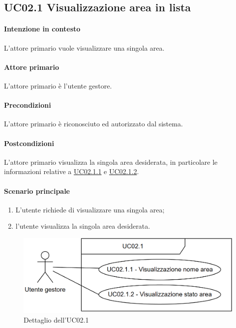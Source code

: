 \subsection{UC02.1 Visualizzazione area in lista}
\paragraph{Intenzione in contesto} L'attore primario vuole visualizzare una singola area.

\paragraph{Attore primario} L'attore primario è l'utente gestore.
\paragraph{Precondizioni} L'attore primario è riconosciuto ed autorizzato dal sistema.
\paragraph{Postcondizioni} L'attore primario visualizza la singola area desiderata, in particolare le informazioni relative a \hyperref[uc:02.1.1]{UC02.1.1} e \hyperref[uc:02.1.2]{UC02.1.2}.

\paragraph{Scenario principale}
\begin{enumerate}
    \item L'utente richiede di visualizzare una singola area;
    \item l'utente visualizza la singola area desiderata.
\end{enumerate}

\begin{figure}[h]
    \includegraphics[width=\textwidth]{contenuti/img/casi_uso_grafici-uc02.1.png}
    \caption{Dettaglio dell'UC02.1}
    \label{fig:uc02.1}
\end{figure}

